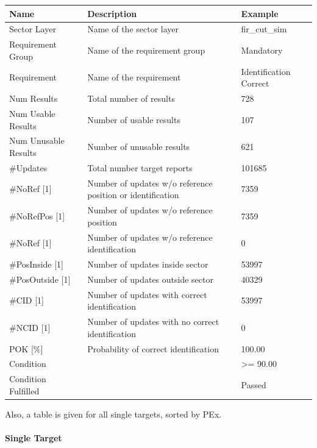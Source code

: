 \begin{center}
 \begin{table}[H]
  \begin{tabularx}{\textwidth}{ | l | X |  l | }
    \hline
    \textbf{Name} & \textbf{Description} & \textbf{Example} \\ \hline
    Sector Layer & Name of the sector layer & fir\_cut\_sim \\ \hline
    Requirement Group & Name of the requirement group & Mandatory \\ \hline
    Requirement & Name of the requirement & Identification Correct \\ \hline
    Num Results & Total number of results & 728 \\ \hline
    Num Usable Results & Number of usable results & 107 \\ \hline
    Num Unusable Results & Number of unusable results & 621 \\ \hline
    \#Updates & Total number target reports & 101685 \\ \hline
    \#NoRef [1] & Number of updates w/o reference position or identification & 7359 \\ \hline
    \#NoRefPos [1] & Number of updates w/o reference position  & 7359 \\ \hline
    \#NoRef [1] & Number of updates w/o reference identification & 0 \\ \hline
    \#PosInside [1] & Number of updates inside sector & 53997 \\ \hline
    \#PosOutside [1] & Number of updates outside sector & 40329 \\ \hline
    \#CID [1] & Number of updates with correct identification & 53997 \\ \hline
    \#NCID [1] & Number of updates with no correct identification & 0 \\ \hline
    POK [\%] & Probability of correct identification & 100.00 \\ \hline
    Condition &  & >= 90.00 \\ \hline
    Condition Fulfilled &  & Passed \\ \hline
\end{tabularx}
\end{table}
\end{center}

Also, a table is given for all single targets, sorted by PEx.

\paragraph{Single Target}

